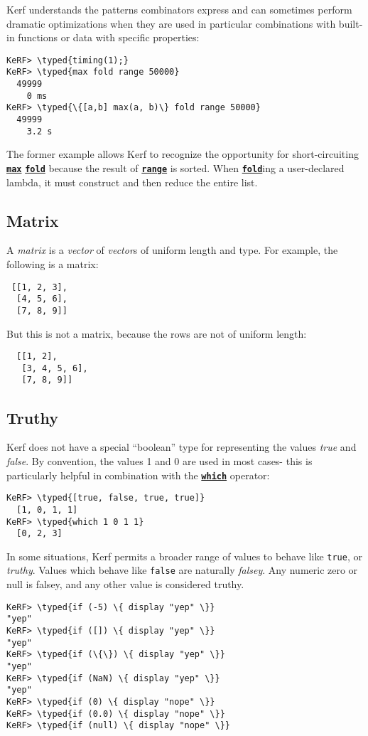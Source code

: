 \documentclass{article}
\newcommand{\typed}[1]{\textcolor{TealBlue}{#1}}
\newcommand{\primu}[2]{\hyperref[prim:#2]{\textbf{\texttt{#1}}}}
\newcommand{\prim}[1]{\primu{#1}{#1}}
\newcommand{\comb}[1]{\primu{#1}{#1}}
\begin{document}
\vspace{0.5cm}

Kerf understands the patterns combinators express and can sometimes perform dramatic optimizations when they are used in particular combinations with built-in functions or data with specific properties:
\begin{Verbatim}
KeRF> \typed{timing(1);}
KeRF> \typed{max fold range 50000}
  49999
    0 ms
KeRF> \typed{\{[a,b] max(a, b)\} fold range 50000}
  49999
    3.2 s
\end{Verbatim}
The former example allows Kerf to recognize the opportunity for short-circuiting \prim{max} \comb{fold} because the result of \prim{range} is sorted. When \comb{fold}ing a user-declared lambda, it must construct and then reduce the entire list.

\pagebreak
\subsection{Matrix}
A \emph{matrix} is a \emph{vector} of \emph{vector}s of uniform length and type. For example, the following is a matrix:
\begin{Verbatim}
 [[1, 2, 3], 
  [4, 5, 6], 
  [7, 8, 9]]
\end{Verbatim}

But this is not a matrix, because the rows are not of uniform length:
\begin{Verbatim}
  [[1, 2], 
   [3, 4, 5, 6], 
   [7, 8, 9]]
\end{Verbatim}

\subsection{Truthy}
Kerf does not have a special ``boolean'' type for representing the values \emph{true} and \emph{false}. By convention, the values 1 and 0 are used in most cases- this is particularly helpful in combination with the \prim{which} operator:
\begin{Verbatim}
KeRF> \typed{[true, false, true, true]}
  [1, 0, 1, 1]
KeRF> \typed{which 1 0 1 1}
  [0, 2, 3]
\end{Verbatim}

In some situations, Kerf permits a broader range of values to behave like \texttt{true}, or \emph{truthy}. Values which behave like \texttt{false} are naturally \emph{falsey}. Any numeric zero or null is falsey, and any other value is considered truthy.
\begin{Verbatim}
KeRF> \typed{if (-5) \{ display "yep" \}}
"yep"
KeRF> \typed{if ([]) \{ display "yep" \}}
"yep"
KeRF> \typed{if (\{\}) \{ display "yep" \}}
"yep"
KeRF> \typed{if (NaN) \{ display "yep" \}}
"yep"
KeRF> \typed{if (0) \{ display "nope" \}}
KeRF> \typed{if (0.0) \{ display "nope" \}}
KeRF> \typed{if (null) \{ display "nope" \}}
\end{Verbatim}
\end{document}
